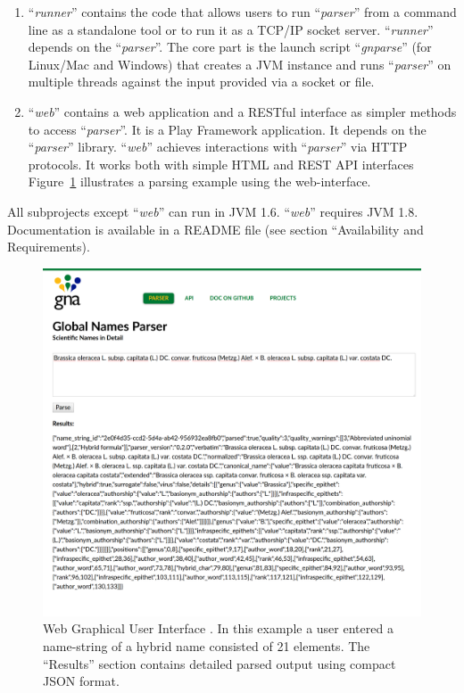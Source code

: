 \documentclass{bmcart}
\begin{document}
\begin{enumerate}
  \item ``\textit{runner}'' contains the code that allows users to run
    ``\textit{parser}'' from a command line as a standalone tool or to run it
    as a TCP/IP socket server. ``\textit{runner}'' depends on the
    ``\textit{parser}''.   The core part is the launch script
    ``\textit{gnparse}'' (for Linux/Mac and Windows) that creates a JVM instance
    and runs ``\textit{parser}'' on multiple threads against the input provided
    via a socket or file.

  \item ``\textit{web}'' contains a web application and a RESTful interface as
    simpler methods to access ``\textit{parser}''. It is a Play Framework
    \cite{wampler2011scala} application. It depends on the ``\textit{parser}''
    library. ``\textit{web}'' achieves interactions with ``\textit{parser}''
    via HTTP protocols. It works both with simple HTML and REST API interfaces
    Figure~\ref{figure:webgui} illustrates a parsing example using the web-interface.

\end{enumerate}

All subprojects except ``\textit{web}'' can run in JVM 1.6. ``\textit{web}''
requires JVM 1.8. Documentation is available in a README file (see section ``Availability and Requirements).

\begin{figure}[htbp]
  \begin{center}

    \caption{Web Graphical User Interface \cite{gnparser-web}. In this example
      a user entered a name-string of a hybrid name consisted of 21 elements.
      The ``Results'' section contains detailed parsed output using compact
      JSON format.}\label{figure:webgui}

    \vspace{5mm}
    \includegraphics[scale=0.175]{images/2.png}
  \end{center}
\end{figure}
\end{document}
